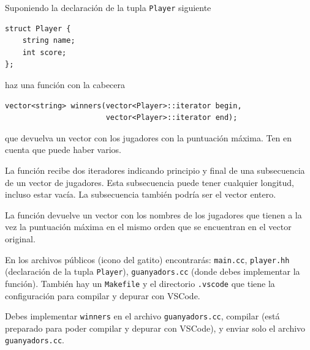 

\Statement

Suponiendo la declaración de la tupla \verb|Player| siguiente
\begin{verbatim}
struct Player { 
    string name; 
    int score;
};
\end{verbatim}
haz una función con la cabecera
\begin{verbatim}
vector<string> winners(vector<Player>::iterator begin,
                       vector<Player>::iterator end);
\end{verbatim}
que devuelva un vector con los jugadores con la puntuación máxima.
Ten en cuenta que puede haber varios.

\Input

La función recibe dos iteradores indicando principio y final de una subsecuencia de un vector de jugadores. Esta subsecuencia puede tener cualquier
longitud, incluso estar vacía. La subsecuencia también podría ser el vector entero.

\Output

La función devuelve un vector con los nombres de los jugadores que tienen
a la vez la puntuación máxima en el mismo orden que se encuentran en el vector
original.

\Observation

En los archivos públicos (icono del gatito) encontrarás: \verb|main.cc|, \verb|player.hh| (declaración de la tupla \verb|Player|), \verb|guanyadors.cc| (donde debes implementar la función). También hay un \verb|Makefile| y el directorio \verb|.vscode| que tiene la configuración para compilar y depurar con VSCode.

Debes implementar \verb|winners| en el archivo \verb|guanyadors.cc|, compilar (está preparado para poder compilar y depurar con VSCode), y enviar solo el archivo \verb|guanyadors.cc|.
\SampleTwoCol


